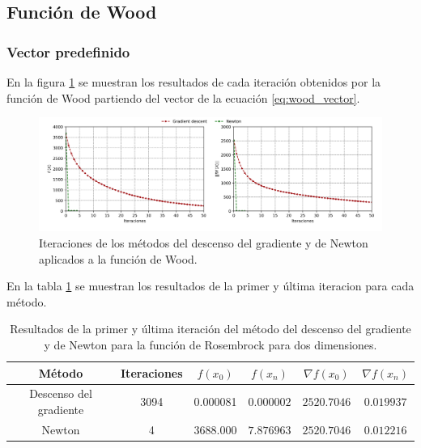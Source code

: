 
\subsection{Función de Wood}

\subsubsection{Vector predefinido}

En la figura \ref{fig:wood} se muestran los resultados de cada iteración obtenidos por la función de Wood partiendo del vector de la ecuación \ref{eq:wood_vector}.

\begin{figure}[H]
    \centering
    \includegraphics[width=17cm]{Graphics/Problema_2/wood_4_predefined.png}
    \caption{Iteraciones de los métodos del descenso del gradiente y de Newton aplicados a la función de Wood.}
    \label{fig:wood}
\end{figure}

En la tabla \ref{table:wood_predefined} se muestran los resultados de la primer y última iteracion para cada método.

\begin{table}[H]
    \centering
    \begin{tabular}{cccccc} \hline
        Método                 & Iteraciones & $f(x_0)$ & $f(x_n)$   & $\nabla f(x_0)$ & $\nabla f(x_n) $ \\ \hline
        Descenso del gradiente & 3094        & 0.000081 & $0.000002$ & $2520.7046$     & $0.019937$       \\
        Newton                 & 4           & 3688.000 & $7.876963$ & $2520.7046$     & $0.012216$       \\ \hline
    \end{tabular}
    \caption{Resultados de la primer y última iteración del método del descenso del gradiente y de Newton para la función de Rosembrock para dos dimensiones.}
    \label{table:wood_predefined}
\end{table}

